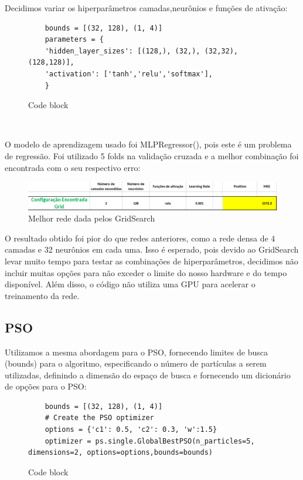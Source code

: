 \documentclass[10pt]{article}
\begin{document}
Decidimos variar os hiperparâmetros camadas,neurônios e funções de ativação:

\begin{figure}[htb]
  \begin{verbatim}
    bounds = [(32, 128), (1, 4)]
    parameters = {
    'hidden_layer_sizes': [(128,), (32,), (32,32), (128,128)],
    'activation': ['tanh','relu','softmax'],
    }
  \end{verbatim}
  \caption{Code block}
  \label{fig:code_1}
\end{figure}

\begin{verbatim}
  
\end{verbatim}

\newpage
O modelo de aprendizagem usado foi MLPRegressor(), pois este é um problema de regressão. 
Foi utilizado 5 folds na validação cruzada e a melhor combinação foi encontrada com o seu 
respectivo erro:

\begin{figure}[htb]
  \centering
  \includegraphics[width=\linewidth]{img/grid.png}
  \caption{Melhor rede dada pelos GridSearch}
  \label{fig:grid}
\end{figure}

O resultado obtido foi pior do que redes anteriores, como a rede densa de 4 camadas e 
32 neurônios em cada uma. Isso é esperado, pois devido ao GridSearch levar muito tempo para 
testar as combinações de hiperparâmetros, decidimos não incluir muitas opções para não exceder 
o limite do nosso hardware e do tempo disponível. Além disso, o código não utiliza uma GPU para 
acelerar o treinamento da rede.

\subsection{PSO}

Utilizamos a mesma abordagem para o PSO, fornecendo limites de busca (bounds) para o 
algoritmo, especificando o número de partículas a serem utilizadas, definindo a dimensão do 
espaço de busca e fornecendo um dicionário de opções para o PSO:

\begin{figure}[htb]
  \begin{verbatim}
    bounds = [(32, 128), (1, 4)]
    # Create the PSO optimizer
    options = {'c1': 0.5, 'c2': 0.3, 'w':1.5}
    optimizer = ps.single.GlobalBestPSO(n_particles=5, dimensions=2, options=options,bounds=bounds)
  \end{verbatim}
  \caption{Code block}
  \label{fig:code_2}
\end{figure}
\end{document}
